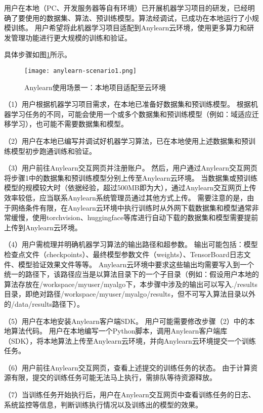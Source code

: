 用户在本地（PC、开发服务器等自有环境）已开展机器学习项目的研发，已经明确了要使用的数据集、算法、预训练模型。算法经调试，已成功在本地运行了小规模训练。
用户希望将此机器学习项目适配到Anylearn云环境，使用更多算力和研发管理功能进行更大规模的训练和验证。

具体步骤如图\ref{fig:scenario1}所示。

\begin{figure}
  \centering
  \texttt{[image: anylearn-scenario1.png]}
  \caption{Anylearn使用场景一：本地项目适配至云环境}
  \label{fig:scenario1}
\end{figure}

（1）用户根据机器学习项目需求，在本地已准备好数据集和预训练模型。
根据机器学习任务的不同，可能会使用一个或多个数据集和预训练模型（例如：域适应迁移学习），也可能不需要数据集和模型。

（2）用户在本地已编写并调试好机器学习算法，已在本地使用上述数据集和预训练模型初步跑通训练和验证。

（3）用户前往Anylearn交互网页并注册账户。
然后，用户通过Anylearn交互网页将步骤1中的数据集和预训练模型分别上传至Anylearn云环境。
当数据集或预训练模型的规模较大时（依据经验，超过500MB即为大），通过Anylearn交互网页上传效率较低，应当联系Anylearn系统管理员通过其他方式上传。
需要注意的是，由于网络条件有限，在Anylearn云环境中执行训练时从外网下载数据集和模型通常非常缓慢，使用torchvision、huggingface等库进行自动下载的数据集和模型需要提前上传到Anylearn云环境。

（4）用户需梳理并明确机器学习算法的输出路径和超参数。
输出可能包括：模型检查点文件（checkpoints）、最终模型参数文件（weights）、TensorBoard日志文件、模型验证效果文件等等。
Anylearn云环境中要求这些输出均需要写入到一个统一的路径下，该路径应当是以算法目录下的一个子目录（例如：假设用户本地的算法存放在/workspace/myuser/myalgo下，本步骤中涉及的输出可以写入./results目录，即绝对路径/workspace/myuser/myalgo/results，但不可写入算法目录以外的/data/results路径下）。

（5）用户在本地安装Anylearn客户端SDK。
用户可能需要修改步骤（2）中的本地算法代码。
用户在本地编写一个Python脚本，调用Anylearn客户端库（SDK），将本地算法上传至Anylearn云环境，并向Anylearn云环境提交一个训练任务。

（6）用户前往Anylearn交互网页，查看上述提交的训练任务的状态。
由于计算资源有限，提交的训练任务可能无法马上执行，需排队等待资源释放。

（7）当训练任务开始执行后，用户在Anylearn交互网页中查看训练任务的日志、系统监控等信息，判断训练执行情况以及训练出的模型的效果。

